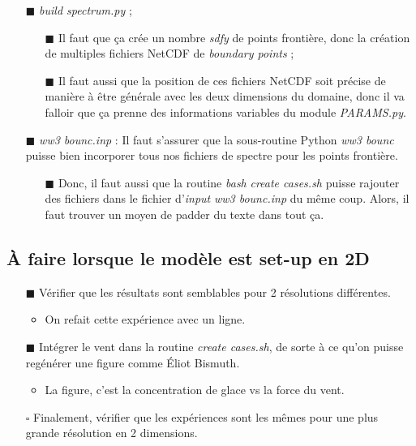 \documentclass[10pt]{article}
\numberwithin{equation}{section}
\renewcommand{\boxtimes}{\blacksquare}
\begin{document}
\begin{itemize}
\begin{itemize}
\end{itemize}
\item[{$\boxtimes$}] \emph{build spectrum.py} ;
\begin{itemize}
\item[{$\boxtimes$}] Il faut que ça crée un nombre \emph{sdfy} de points frontière, donc la création de multiples fichiers NetCDF de \emph{boundary points} ;
\item[{$\boxtimes$}] Il faut aussi que la position de ces fichiers NetCDF soit précise de manière à être générale avec les deux dimensions du domaine, donc il va falloir que ça prenne des informations variables du module \emph{PARAMS.py}.
\end{itemize}
\item[{$\boxtimes$}] \emph{ww3 bounc.inp} : Il faut s'assurer que la sous-routine Python \emph{ww3 bounc} puisse bien incorporer tous nos fichiers de spectre pour les points frontière.
\begin{itemize}
\item[{$\boxtimes$}] Donc, il faut aussi que la routine \emph{bash} \emph{create cases.sh} puisse rajouter des fichiers dans le fichier d'\emph{input} \emph{ww3 bounc.inp} du même coup. Alors, il faut trouver un moyen de padder du texte dans tout ça.
\end{itemize}
\end{itemize}
\subsection{À faire lorsque le modèle est set-up en 2D}
\label{sec:org9b4a561}
\begin{itemize}
\item[{$\boxtimes$}] Vérifier que les résultats sont semblables pour 2 résolutions différentes.
\begin{itemize}
\item On refait cette expérience avec un ligne.
\end{itemize}
\item[{$\boxtimes$}] Intégrer le vent dans la routine \emph{create cases.sh}, de sorte à ce qu'on puisse regénérer une figure comme Éliot Bismuth.
\begin{itemize}
\item La figure, c'est la concentration de glace vs la force du vent.
\end{itemize}
\item[{$\square$}] Finalement, vérifier que les expériences sont les mêmes pour une plus grande résolution en 2 dimensions.
\end{itemize}


\printbibliography
\end{document}
